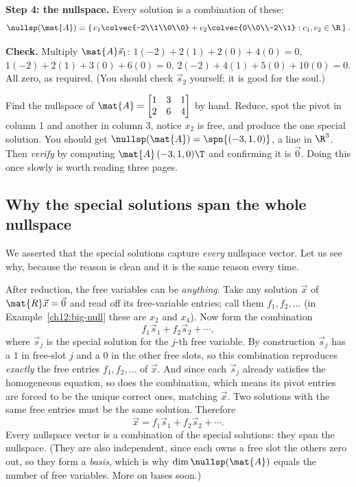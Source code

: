\begin{example}
\textbf{Step 4: the nullspace.} Every solution is a combination of these:
\[
  \nullsp(\mat{A}) = \left\{\, c_1 \colvec{-2\\1\\0\\0} + c_2\colvec{0\\0\\-2\\1}
  : c_1, c_2 \in\R \,\right\}.
\]

\textbf{Check.} Multiply $\mat{A}\vec{s}_1$:
$1(-2)+2(1)+2(0)+4(0) = 0$, $1(-2)+2(1)+3(0)+6(0)=0$, $2(-2)+4(1)+5(0)+10(0)=0$.
All zero, as required. (You should check $\vec{s}_2$ yourself; it is good for the
soul.)
\end{example}

\begin{labbox}
Find the nullspace of $\mat{A}=\begin{bmatrix}1 & 3 & 1\\2 & 6 & 4\end{bmatrix}$
by hand. Reduce, spot the pivot in column 1 and another in column 3, notice $x_2$
is free, and produce the one special solution. You should get $\nullsp(\mat{A}) =
\spn\{(-3,1,0)\}$, a line in $\R^3$. Then \emph{verify} by computing
$\mat{A}\,(-3,1,0)\T$ and confirming it is $\vec 0$. Doing this once slowly is
worth reading three pages.
\end{labbox}

\subsection{Why the special solutions span the whole nullspace}

We asserted that the special solutions capture \emph{every} nullspace vector. Let
us see why, because the reason is clean and it is the same reason every time.

After reduction, the free variables can be \emph{anything}. Take any solution
$\vec{x}$ of $\mat{R}\vec{x}=\vec{0}$ and read off its free-variable entries; call
them $f_1, f_2, \dots$ (in Example~\ref{ch12:big-null} these are $x_2$ and
$x_4$). Now form the combination
\[
  f_1\vec{s}_1 + f_2\vec{s}_2 + \cdots,
\]
where $\vec{s}_j$ is the special solution for the $j$-th free variable. By
construction $\vec{s}_j$ has a $1$ in free-slot $j$ and a $0$ in the other free
slots, so this combination reproduces \emph{exactly} the free entries
$f_1,f_2,\dots$ of $\vec{x}$. And since each $\vec{s}_j$ already satisfies the
homogeneous equation, so does the combination, which means its pivot entries are
forced to be the unique correct ones, matching $\vec{x}$. Two solutions with the
same free entries must be the same solution. Therefore
\[
  \vec{x} = f_1\vec{s}_1 + f_2\vec{s}_2 + \cdots.
\]
Every nullspace vector is a combination of the special solutions: they span the
nullspace. (They are also independent, since each owns a free slot the others
zero out, so they form a \emph{basis}, which is why $\dim\nullsp(\mat{A})$ equals
the number of free variables. More on bases soon.)

